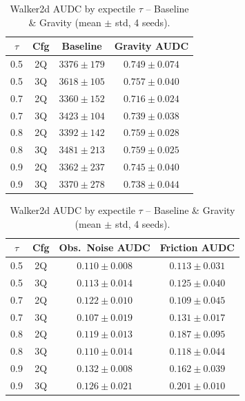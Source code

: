 \documentclass[conference]{IEEEtran}
\begin{document}
\begin{table}[t]
  \centering
  \caption{Walker2d AUDC by expectile $\tau$ -- Baseline \& Gravity
           (mean $\pm$ std, 4 seeds).}
  \label{tab:tau-walker}
  \small
  \begin{tabular}{cccc}
    \toprule
    $\tau$ & Cfg & Baseline & Gravity AUDC \\
    \midrule
    0.5 & 2Q & $3376\pm179$ & $0.749\pm0.074$ \\
    0.5 & 3Q & $3618\pm105$ & $0.757\pm0.040$ \\
    0.7 & 2Q & $3360\pm152$ & $0.716\pm0.024$ \\
    0.7 & 3Q & $3423\pm104$ & $0.739\pm0.038$ \\
    0.8 & 2Q & $3392\pm142$ & $0.759\pm0.028$ \\
    0.8 & 3Q & $3481\pm213$ & $0.759\pm0.025$ \\
    0.9 & 2Q & $3362\pm237$ & $0.745\pm0.040$ \\
    0.9 & 3Q & $3370\pm278$ & $0.738\pm0.044$ \\
    \bottomrule
  \end{tabular}

  \vspace{4pt}

  \begin{tabular}{cccc}
    \toprule
    $\tau$ & Cfg & Obs.\ Noise AUDC & Friction AUDC \\
    \midrule
    0.5 & 2Q & $0.110\pm0.008$ & $0.113\pm0.031$ \\
    0.5 & 3Q & $0.113\pm0.014$ & $0.125\pm0.040$ \\
    0.7 & 2Q & $0.122\pm0.010$ & $0.109\pm0.045$ \\
    0.7 & 3Q & $0.107\pm0.019$ & $0.131\pm0.017$ \\
    0.8 & 2Q & $0.119\pm0.013$ & $0.187\pm0.095$ \\
    0.8 & 3Q & $0.110\pm0.014$ & $0.118\pm0.044$ \\
    0.9 & 2Q & $0.132\pm0.008$ & $0.162\pm0.039$ \\
    0.9 & 3Q & $0.126\pm0.021$ & $0.201\pm0.010$ \\
    \bottomrule
  \end{tabular}
\end{table}
\end{document}
